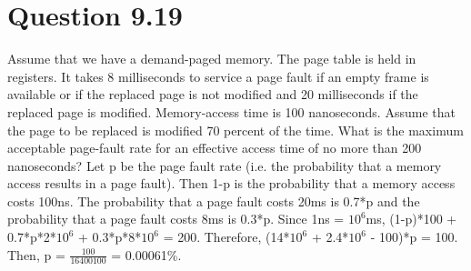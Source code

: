 \documentclass[12pt]{article}
\begin{document}
\section*{Question 9.19}{\color{blue}Assume that we have a demand-paged memory. The page table is held in registers. It takes 8 milliseconds to service a page fault if an empty frame is available or if the replaced page is not modified and 20 milliseconds if the replaced page is modified. Memory-access time is 100 nanoseconds. Assume that the page to be replaced is modified 70 percent of the time. What is the maximum acceptable page-fault rate for an effective access time of no more than 200 nanoseconds?} Let p be the page fault rate (i.e. the probability that a memory access results in a page fault). Then 1-p is the probability that a memory access costs 100ns. The probability that a page fault costs 20ms is 0.7*p and the probability that a page fault costs 8ms is 0.3*p. Since 1ns = $10^{6}$ms, (1-p)*100 + 0.7*p*2*$10^{6}$ + 0.3*p*8*$10^{6}$ = 200. Therefore, (14*$10^{6}$ + 2.4*$10^{6}$ - 100)*p = 100. Then, p = $\frac{100}{16400100}$ = 0.00061\%.
\end{document}
